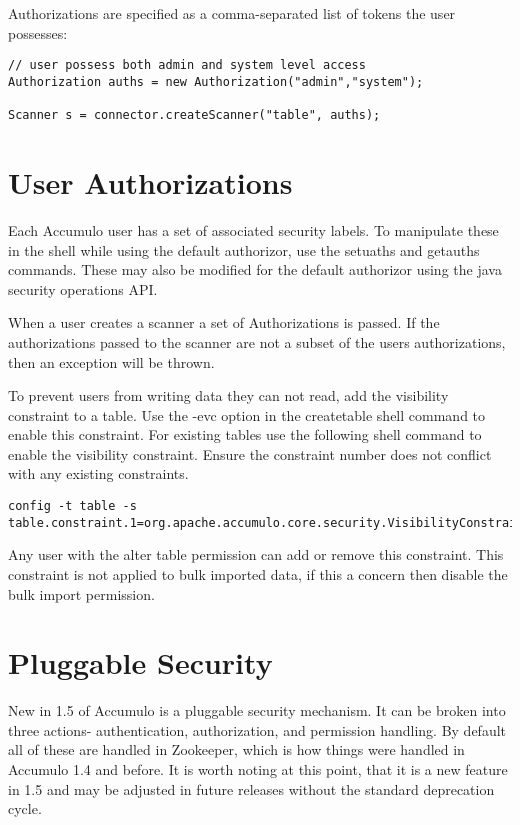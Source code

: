 Authorizations are specified as a comma-separated list of tokens the user possesses:

\begingroup\fontsize{8pt}{8pt}\selectfont\begin{verbatim}
// user possess both admin and system level access
Authorization auths = new Authorization("admin","system");

Scanner s = connector.createScanner("table", auths);
\end{verbatim}\endgroup

\section{User Authorizations}

Each Accumulo user has a set of associated security labels. To manipulate
these in the shell while using the default authorizor, use the setuaths and getauths commands.
These may also be modified for the default authorizor using the java security operations API. 

When a user creates a scanner a set of Authorizations is passed. If the
authorizations passed to the scanner are not a subset of the users
authorizations, then an exception will be thrown.

To prevent users from writing data they can not read, add the visibility
constraint to a table. Use the -evc option in the createtable shell command to
enable this constraint. For existing tables use the following shell command to
enable the visibility constraint. Ensure the constraint number does not
conflict with any existing constraints.
  
\begingroup\fontsize{8pt}{8pt}\selectfont\begin{verbatim}
config -t table -s table.constraint.1=org.apache.accumulo.core.security.VisibilityConstraint
\end{verbatim}\endgroup

Any user with the alter table permission can add or remove this constraint.
This constraint is not applied to bulk imported data, if this a concern then
disable the bulk import permission.

\section{Pluggable Security}

New in 1.5 of Accumulo is a pluggable security mechanism. It can be broken into three actions-
authentication, authorization, and permission handling. By default all of these are handled in
Zookeeper, which is how things were handled in Accumulo 1.4 and before. It is worth noting at this
point, that it is a new feature in 1.5 and may be adjusted in future releases without the standard
deprecation cycle.

